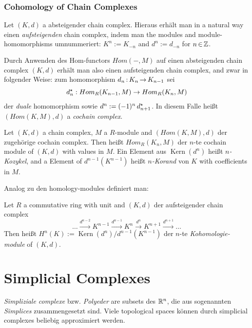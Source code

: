 \documentclass[11pt,twoside]{article}
\begin{document}
\section{Cohomology of Chain Complexes}
Let $(K,d)$ a absteigender chain complex.
Hieraus erhält man in a natural way einen \textit{aufsteigenden}
chain complex,
indem man the modules and module-homomorphisms umnummeriert:
$K^n := K_{-n}$ and $d^n := d_{-n}$ for $n {\,\in\,} {\mathbb{Z}}$.

\subparagraph{}
Durch Anwenden des Hom-functors $Hom(-,M)$ auf einen absteigenden chain complex
$(K,d)$ erhält man also einen aufsteigenden chain complex,
and zwar in folgender Weise:
zum homomorphism $d_n {\,:\,} K_n {\,\to\,} K_{n-1}$ sei
\[
d^{\star}_n: Hom_R(K_{n-1},M) \to Hom_R(K_n,M)
\]
der \textit{duale} homomorphism sowie $d^n := (-1)^n \, d^{\star}_{n+1}$.
In diesem Falle heißt $(Hom(K,M),d)$ a \textit{cochain complex}.

\begin{definition}
Let $(K,d)$ a chain complex, $M$ a $R$-module and $(Hom(K,M),d)$ der
zugehörige cochain complex.
Then heißt $Hom_R(K_n,M)$ der $n$-te cochain module of $(K,d)$
with values in $M$.
Ein Element aus $\operatorname{Kern}(d^n)$ heißt \textit{$n$-Kozykel},
and a Element of $d^{n-1}(K^{n-1})$ heißt \textit{$n$-Korand} von
$K$ with coefficients in $M$.
\end{definition}

\subparagraph{}
Analog zu den homology-modules definiert man:

\begin{definition}
Let $R$ a commutative ring with unit and $(K,d)$ der aufsteigender
chain complex
\[
\ldots
\stackrel{d^{n-2}}{\longrightarrow}
K^{n-1}
\stackrel{d^{n-1}}{\longrightarrow}
K^{n}
\stackrel{d^{n}}{\longrightarrow}
K^{n+1}
\stackrel{d^{n+1}}{\longrightarrow}
\ldots
\]
Then heißt
$H^n(K) := \operatorname{Kern}(d^n) / d^{n-1}(K^{n-1})$
der $n$-te \textit{Kohomologie-module} of $(K,d)$.
\end{definition}

\part{Simplicial Complexes}
\textit{Simpliziale complexe} bzw. \textit{Polyeder} are subsets des ${\mathbb{R}}^n$,
die aus sogenannten \textit{Simplices} zusammengesetzt sind.
Viele topological spaces k\"onnen durch simplicial complexes
beliebig approximiert werden.
\end{document}

